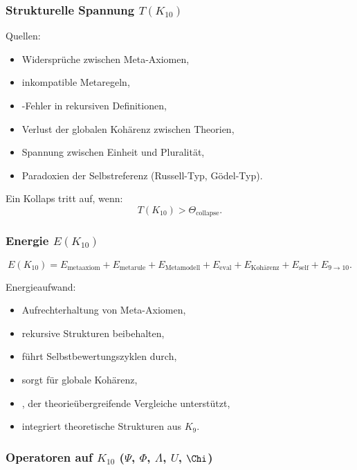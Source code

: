 \subsubsection{Strukturelle Spannung $T(K_{10})$}

Quellen:
\begin{itemize}
    \item Widersprüche zwischen Meta-Axiomen,
    \item inkompatible Metaregeln,
    \item-Fehler in rekursiven Definitionen,
    \item Verlust der globalen Kohärenz zwischen Theorien,
    \item Spannung zwischen Einheit und Pluralität,
    \item Paradoxien der Selbstreferenz (Russell-Typ, Gödel-Typ).
\end{itemize}

Ein Kollaps tritt auf, wenn:
\[
T(K_{10}) > \Theta_{\mathrm{collapse}}.
\]

\subsubsection{Energie $E(K_{10})$}

\[
E(K_{10})=
E_{\mathrm{metaaxiom}}+
E_{\mathrm{metarule}}+
E_{\mathrm{Metamodell}}+
E_{\mathrm{eval}}+
E_{\mathrm{Kohärenz}}+
E_{\mathrm{self}}+
E_{9\to10}.
\]

Energieaufwand:
\begin{itemize}
    \item Aufrechterhaltung von Meta-Axiomen,
    \item rekursive Strukturen beibehalten,
    \item führt Selbstbewertungszyklen durch,
    \item sorgt für globale Kohärenz,
    \item, der theorieübergreifende Vergleiche unterstützt,
    \item integriert theoretische Strukturen aus $K_9$.
\end{itemize}

\subsubsection{Operatoren auf $K_{10}$ ($\Psi$, $\Phi$, $\Lambda$, $U$, $\Chi$)}

